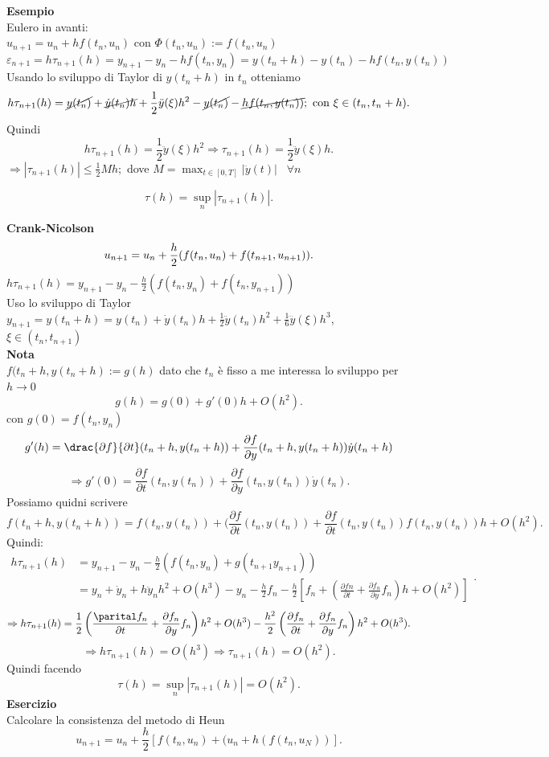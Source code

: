 \documentclass[12px]{article}
\begin{document}
\textbf{Esempio}\\
Eulero in avanti:\\
$u_{n+1} = u_n + hf(t_n,u_n)$ con  $\Phi(t_n,u_n):= f(t_n,u_n)$\\
$\varepsilon_{n+1}= h\tau_{n+1}(h) = y_{n+1}-y_n-hf(t_n,y_n) = y(t_n + h) - y(t_n) - hf(t_n,y(t_n))$\\
Usando lo sviluppo di Taylor di  $y(t_n + h)$ in  $t_n$ otteniamo
 \[
	 h\tau_{n+1}(h) = \cancel{y(t_n)} + \cancel{\dot y(t_n)h} + \frac 12 \ddot y(\xi)h^2 - \cancel{y(t_n)} - \cancel{hf(t_n,y(t_n))}; \text{ con } \xi\in(t_n, t_n + h)
.\] 
Quindi 
\[
	h\tau_{n+1}(h) = \frac 12 \ddot y(\xi)h^2 \Rightarrow  \tau_{n+1}(h) = \frac 12\ddot y(\xi)h
.\]  
$ \Rightarrow  |\tau_{n+1}(h)|\leq \frac 12 Mh;$ dove $M = \max_{t\in[0,T]}|\ddot y(t)|$ \  $\forall n$\\
\begin{defi}
	\[
		\tau(h) = \sup_{n}|\tau_{n+1}(h)|
	.\] 
\end{defi}
\textbf{Crank-Nicolson}
\[
	u_{n+1} = u_n + \frac h 2(f(t_n,u_n) + f(t_{n+1}, u_{n+1}))\\
.\] 
$h\tau_{n+1}(h) = y_{n+1} - y_n - \frac h 2 (f(t_n,y_n) + f(t_n,y_{n+1}))$\\
Uso lo sviluppo di Taylor\\
$y_{n+1} = y(t_n + h) = y(t_n) + \dot y(t_n) h + \frac 12 \ddot y(t_n)h^2 + \frac 16 \dddot y (\xi) h^3$, \ \ $\xi \in (t_n,t_{n+1})$\\
 \textbf{Nota}\\
 $f(t_n + h, y(t_n + h):= g(h)$ dato che  $t_n$ è fisso a me interessa lo sviluppo per $h \rightarrow 0$\\
 \[
 g(h) = g(0) + g'(0) h + O(h^2)
 .\] 
 con $g(0) = f(t_n,y_n)$ \\
\[
	g'(h) = \drac{\partial f}{\partial t}(t_n+h,y(t_n+h)) + \frac{\partial f}{\partial y} (t_n+h,y(t_n+h))\dot y(t_n+h)
\] 
\[
	\Rightarrow g'(0) = \frac{\partial f}{\partial t}(t_n,y(t_n)) + \frac {\partial f}{\partial y}(t_n,y(t_n))\dot y(t_n)
.\] 
Possiamo quidni scrivere
\[
	f(t_n+h,y(t_n+h)) = f(t_n,y(t_n)) + (\frac{\partial f}{\partial t}(t_n,y(t_n)) + \frac{\partial f}{\partial t} (t_n,y(t_n))f(t_n,y(t_n))h + O(h^2)
.\] 
Quindi:\\
\[
	\begin{split}
		h\tau_{n+1}(h) & = y_{n+1}-y_n-\frac h 2(f(t_n,y_n) + g(t_{n+1}y_{n+1}))\\
			       & =y_n + \dot y_n + h\ddot y_n h^2 + O(h^3) - y_n - \frac h 2 f_n - \frac h 2 \left[ f_n + \left(\frac{\partial fn}{\partial t} + \frac {\partial f_n}{\partial y}f_n \right)h + O(h^2)\right]
	\end{split}
.\] 
\[
	\Rightarrow  h\tau_{n+1}(h) = \frac 12 \left(\frac{\parital f_n}{\partial t} + \frac{\partial f_n}{\partial y} f_n \right) h^2+ O(h^3) - \frac {h^2}2 \left(\frac {\partial f_n}{\partial t} + \frac{\partial f_n}{\partial y}f_n \right)h^2 + O(h^3)
.\] 
\[
	\Rightarrow  h\tau_{n+1}(h) = O(h^3) \Rightarrow  \tau_{n+1}(h) = O(h^2)
.\] 
Quindi facendo
\[
\tau(h) = \sup_n|\tau_{n+1}(h)| =  O(h^2)
.\] 
\textbf{Esercizio}\\
Calcolare la consistenza del metodo di Heun
\[
	u_{n+1} = u_n + \frac {h} 2 [f(t_n,u_n) + (u_n + h(f(t_n,u_N))]
.\] 
\end{document}
